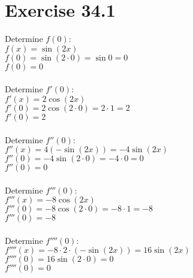 \documentclass[a4paper, 10pt]{scrartcl}
\begin{document}
\section{Exercise 34.1}

Determine $f(0)$:\\
$f(x) = \sin{(2x)}$\\
$f(0) = \sin{(2 \cdot 0)} = \sin{0} = 0$\\
$f(0) = 0$\\
\\
Determine $f'(0)$:\\
$f'(x) = 2 \cos{(2x)}$\\
$f'(0) = 2 \cos{(2 \cdot 0)} = 2 \cdot 1 = 2$\\
$f'(0) = 2$\\
\\
Determine $f''(0)$:\\
$f''(x) = 4 (- \sin{(2x)}) = -4 \sin{(2x)}$\\
$f''(0) = -4 \sin{(2 \cdot 0)} = -4 \cdot 0 = 0$\\
$f''(0) = 0$\\
\\
Determine $f'''(0)$:\\
$f'''(x) = -8 \cos{(2x)}$\\
$f'''(0) = -8 \cos{(2 \cdot 0)} = -8 \cdot 1 = -8$\\
$f'''(0) = -8$\\
\\
Determine $f''''(0)$:\\
$f''''(x) = -8 \cdot 2 \cdot (- \sin{(2x)}) = 16 \sin{(2x)}$\\
$f''''(0) = 16 \sin{(2 \cdot 0)} = 0$\\
$f''''(0) = 0$\\
\end{document}
